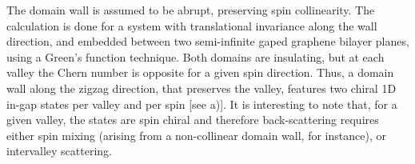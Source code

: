 The domain wall is assumed to be abrupt, preserving spin collinearity. The calculation is done for a system with translational invariance along the wall direction, and embedded between two semi-infinite gaped graphene bilayer planes, using a Green’s function technique\cite{Lado2015}. Both domains are insulating, but at each valley the Chern number is opposite for a given spin direction. Thus, a domain wall along the zigzag direction, that preserves the valley, features two chiral 1D in-gap states per valley and per spin [see a)]. It is interesting to note that, for a given valley, the states are spin chiral and therefore back-scattering requires either spin mixing (arising from a non-collinear domain wall, for instance), or intervalley scattering. %








